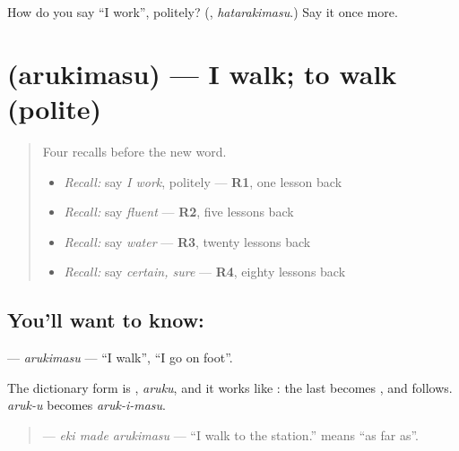 \begin{tcolorbox}[breakable,colback=teal!4,colframe=teal!35!black,title={Before you move on}]
How do you say \textquotedblleft{}I work\textquotedblright{}, politely? (\textbf{}, \emph{hatarakimasu}.) Say it once more.
\end{tcolorbox}
\section[\texorpdfstring{\ja{あるきます} (arukimasu)}{あるきます (arukimasu)}]{ (arukimasu) — I walk; to walk (polite)}

\label{lesson:JA-C138-arukimasu}



\begin{quote}
Four recalls before the new word.

\begin{itemize}
\raggedright
  \item \emph{Recall:} say \emph{I work}, politely — \textbf{R1}, one lesson back
  \item \emph{Recall:} say \emph{fluent} — \textbf{R2}, five lessons back
  \item \emph{Recall:} say \emph{water} — \textbf{R3}, twenty lessons back
  \item \emph{Recall:} say \emph{certain, sure} — \textbf{R4}, eighty lessons back
\end{itemize}
\end{quote}

\subsection*{You'll want to know: }
\textbf{} — \emph{arukimasu} — \textquotedblleft{}I walk\textquotedblright{}, \textquotedblleft{}I go on foot\textquotedblright{}.

The dictionary form is \textbf{}, \emph{aruku}, and it works like \textbf{}: the last \textbf{} becomes \textbf{}, and \textbf{} follows. \emph{aruk-u} becomes \emph{aruk-i-masu}.

\begin{quote}
\textbf{ } — \emph{eki made arukimasu} — \textquotedblleft{}I walk to the station.\textquotedblright{} \textbf{} means \textquotedblleft{}as far as\textquotedblright{}.
\end{quote}

